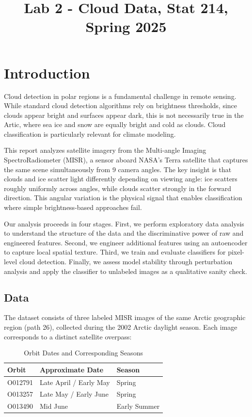 \documentclass[10pt,letterpaper]{article}
\title{Lab 2 - Cloud Data, Stat 214, Spring 2025\vspace{-2em}}
\begin{document}
\maketitle

\section{Introduction}

Cloud detection in polar regions is a fundamental challenge in remote sensing. While standard cloud detection algorithms rely on brightness thresholds, since clouds appear bright and surfaces appear dark, this is not necessarily true in the Artic, where sea ice and snow are equally bright and cold as clouds. Cloud classification is particularly relevant for climate modeling. 

This report analyzes satellite imagery from the Multi-angle Imaging SpectroRadiometer (MISR), a sensor aboard NASA's Terra satellite that captures the same scene simultaneously from 9 camera angles. The key insight is that clouds and ice scatter light differently depending on viewing angle: ice scatters roughly uniformly across angles, while clouds scatter strongly in the forward direction. This angular variation is the physical signal that enables classification where simple brightness-based approaches fail.

Our analysis proceeds in four stages. First, we perform exploratory data analysis to understand the structure of the data and the discriminative power of raw and engineered features. Second, we engineer additional features using an autoencoder to capture local spatial texture. Third, we train and evaluate classifiers for pixel-level cloud detection. Finally, we assess model stability through perturbation analysis and apply the classifier to unlabeled images as a qualitative sanity check.

\subsection{Data}

The dataset consists of three labeled MISR images of the same Arctic geographic region (path 26), collected during the 2002 Arctic daylight season. Each image corresponds to a distinct satellite overpass:

\begin{table}[h!]
\centering
\begin{tabular}{lll}
\hline
\textbf{Orbit} & \textbf{Approximate Date} & \textbf{Season} \\
\hline
O012791 & Late April / Early May & Spring \\
O013257 & Late May / Early June & Spring \\
O013490 & Mid June & Early Summer \\
\hline
\end{tabular}
\caption{Orbit Dates and Corresponding Seasons}
\label{tab:orbit_seasons}
\end{table}
\end{document}
